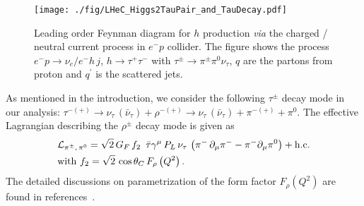 \documentclass[pdftex,twocolumn,epjc3]{svjour3}          %
\begin{document}
\begin{figure}[t]%
  \centering
  \texttt{[image: ./fig/LHeC\_Higgs2TauPair\_and\_TauDecay.pdf]}\label{fig:figNc}
  \caption{  \small Leading order Feynman diagram for $h$ production {\it via} the charged / neutral current process in $e^- p$ collider. The figure shows the process $e^- p \to \nu_e/e^- h \,j$, $h \to \tau^+ \tau^-$ with $\tau^\pm \to \pi^\pm \pi^0 \nu_\tau$, $q$ are the partons from proton and $q^\prime$ is the scattered jets.}
\label{fig:figW}
\end{figure} 
As mentioned in the introduction, we consider the following $\tau^\pm $  decay mode in our analysis: $\tau^{-(+)}\to\nu_\tau\,(\bar\nu_\tau) +\rho^{-(+)}\to \nu_\tau\,(\bar\nu_\tau)+\pi^{-(+)}+\pi^0$. The effective Lagrangian  describing the $\rho^\pm$  decay mode is given as 
\begin{align}
&{\cal L}_{\pi^\pm,\,\pi^0} = \sqrt{2}\, G_F\, f_2\, \,\,\bar \tau \gamma^\mu \,P_L\,\nu_\tau\,\left(\pi^-\,\partial_\mu\pi^--\pi^-\partial_\mu\pi^0\right) +{\rm h.c.}\notag\\ 
&{\rm with}\,\, f_2=\sqrt{2}\,\cos\theta_C\, F_\rho\left(Q^2\right).\label{taudecayvertex}
\end{align}
The detailed discussions on parametrization of the form factor $F_\rho\left(Q^2\right)$ are found in references~\cite{Hagiwara:2012vz,Jadach:1990mz,Kuhn:1990ad}.
\end{document}
